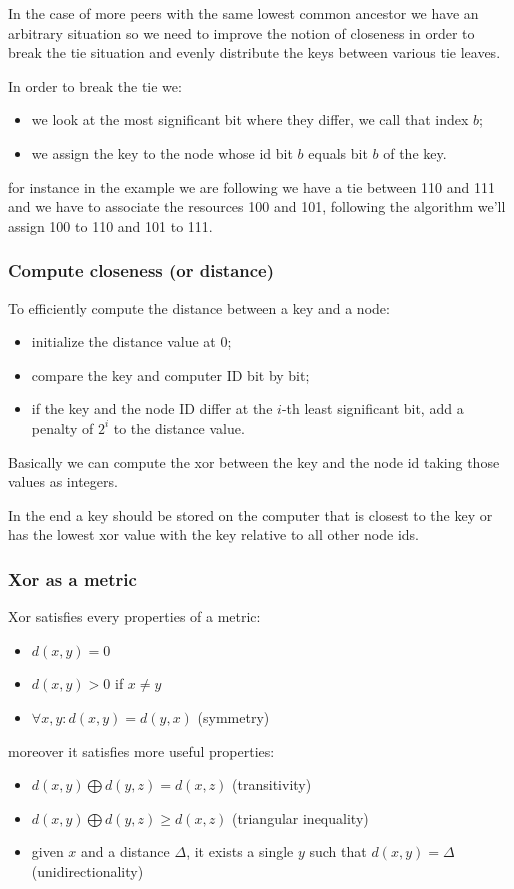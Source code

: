 In the case of more peers with the same lowest common ancestor we have an arbitrary situation so we need to improve the notion of closeness in order to break the tie situation and evenly distribute the keys between various tie leaves.

In order to break the tie we:
\begin{itemize}
    \item we look at the most significant bit where they differ, we call that index $b$;
    \item we assign the key to the node whose id bit $b$ equals bit $b$ of the key.
\end{itemize}
for instance in the example we are following we have a tie between 110 and 111 and we have to associate the resources 100 and 101, following the algorithm we'll assign 100 to 110 and 101 to 111.

\subsubsection{Compute closeness (or distance)}
To efficiently compute the distance between a key and a node:
\begin{itemize}
    \item initialize the distance value at 0;
    \item compare the key and computer ID bit by bit;
    \item if the key and the node ID differ at the $i$-th least significant bit, add a penalty of $2^i$ to the distance value.
\end{itemize}
Basically we can compute the xor between the key and the node id taking those values as integers.

In the end a key should be stored on the computer that is closest to the key or has the lowest xor value with the key relative to all other node ids.

\subsubsection{Xor as a metric}
Xor satisfies every properties of a metric:
\begin{itemize}
    \item $d(x,y) = 0$
    \item $d(x,y) > 0 $ if $x \neq y$
    \item $\forall x,y : d(x,y) = d(y,x)$ (symmetry)
\end{itemize}
moreover it satisfies more useful properties:
\begin{itemize}
    \item $d(x,y) \bigoplus d(y,z) = d(x,z)$ (transitivity)
    \item $d(x,y) \bigoplus d(y,z) \geq d(x,z)$ (triangular inequality)
    \item given $x$ and a distance $\Delta$, it exists a single $y$ such that $d(x,y) = \Delta$ (unidirectionality)
\end{itemize}

